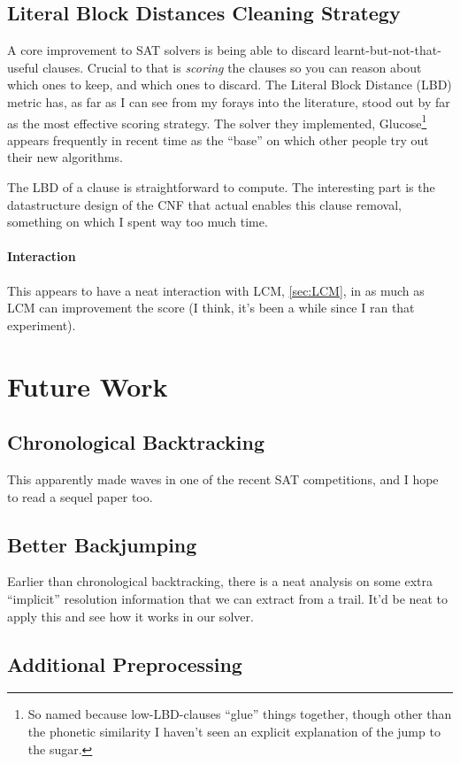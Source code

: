 \documentclass{article}
\begin{document}
\subsection{Literal Block Distances Cleaning Strategy}\label{sec:LBD}
A core improvement to SAT solvers is being able to discard learnt-but-not-that-useful clauses.
Crucial to that is \emph{scoring} the clauses so you can reason about which ones to keep, and which ones to discard.
The Literal Block Distance (LBD) metric\cite{audemardsimon2009} has, as far as I can see from my forays into the literature, stood out by far as the most effective scoring strategy.
The solver they implemented, Glucose\footnote{So named because low-LBD-clauses ``glue'' things together, though other than the phonetic similarity I haven't seen an explicit explanation of the jump to the sugar.} appears frequently in recent time as the ``base'' on which other people try out their new algorithms.

The LBD of a clause is straightforward to compute.
The interesting part is the datastructure design of the CNF that actual enables this clause removal, something on which I spent way too much time.
\paragraph{Interaction} This appears to have a neat interaction with LCM, \cref{sec:LCM}, in as much as LCM can improvement the score (I think, it's been a while since I ran that experiment).

\section{Future Work}
\subsection{Chronological Backtracking}
This\cite{nadelryvchin2018} apparently made waves in one of the recent SAT competitions, and I hope to read a sequel paper\cite{mohlebiere2019} too.
\subsection{Better Backjumping}
Earlier than chronological backtracking, there is a neat analysis on some extra ``implicit'' resolution information that we can extract from a trail\cite{audemardetal2008}.
It'd be neat to apply this and see how it works in our solver.
\subsection{Additional Preprocessing}
\end{document}
